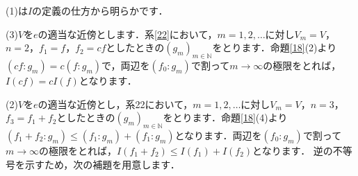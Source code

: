 \begin{Proof}
(1)は$I$の定義の仕方から明らかです．

(3)$V$を$e$の適当な近傍とします．系\ref{22}において，$m=1,2,\ldots$に対し$V_m=V$，$n=2$，$f_1=f$，$f_2=cf$としたときの$(g_m)_{m \in \mathbb{N}}$をとります．命題\ref{18}(2)より$(cf \colon g_m)=c(f \colon g_m)$で，両辺を$(f_0 \colon g_m)$で割って$m \to \infty$の極限をとれば，$I(cf)=cI(f)$となります．

(2)$V$を$e$の適当な近傍とし，系22において，$m=1,2,\ldots$に対し$V_m=V$，$n=3$，$f_3=f_1+f_2$としたときの$(g_m)_{m \in \mathbb{N}}$をとります．命題\ref{18}(4)より$(f_{1}+f_{2} \colon g_m ) \le (f_1 \colon g_m )+(f_1 \colon g_m)$となります．両辺を$(f_0 \colon g_m)$で割って$m \to \infty$の極限をとれば，$I(f_1+f_2) \le I(f_1)+I(f_2)$となります．
逆の不等号を示すため，次の補題を用意します．


\end{Proof}
